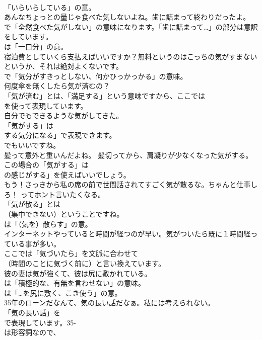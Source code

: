 \documentclass[8pt]{extreport}
\begin{document}
\begin{CJK}{UTF8}{min}
\\	「いらいらしている」の意。	
\\	あんなちょっとの量じゃ食べた気しないよね。歯に詰まって終わりだったよ。 
\\	で「全然食べた気がしない」の意味になります。「歯に詰まって…」の部分は意訳をしています。
\\	は「一口分」の意。	
\\	宿泊費としていくら支払えばいいですか？無料というのはこっちの気がすまないというか、それは絶対よくないです。 
\\	で「気分がすきっとしない、何かひっかっかる」の意味。	
\\	何度傘を無くしたら気が済むの？ 
\\	「気が済む」とは、「満足する」という意味ですから、ここでは
\\	を使って表現しています。	
\\	自分でもできるような気がしてきた。 
\\	「気がする」は
\\	する気分になる」で表現できます。
\\	でもいいですね。	
\\	髪って意外と重いんだよね。 髪切ってから、肩凝りが少なくなった気がする。 
\\	この場合の「気がする」は
\\	の感じがする」を使えばいいでしょう。	
\\	もう！さっきから私の席の前で世間話されてすごく気が散るな。ちゃんと仕事しろ！ ってホント言いたくなる。 
\\	「気が散る」とは 
\\	（集中できない）ということですね。
\\	は「（気を）散らす」の意。	
\\	インターネットやっていると時間が経つのが早い。気がついたら既に１時間経っている事が多い。 
\\	ここでは「気づいたら」を文脈に合わせて
\\	（時間のことに気づく前に）と言い換えています。	
\\	彼の妻は気が強くて、彼は尻に敷かれている。 
\\	は「積極的な、有無を言わせない」の意味。
\\	は「…を尻に敷く、こき使う」の意。	
\\	35年のローンだなんて、気の長い話だなぁ。私には考えられない。 
\\	「気の長い話」を
\\	で表現しています。35-
\\	は形容詞なので、

\end{CJK}
\end{document}
